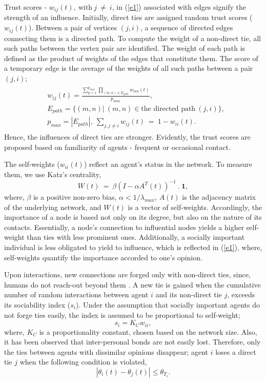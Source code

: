 \documentclass[letterpaper,english,11pt]{article}
\begin{document}
Trust scores - $w_{ij}(t),~\text{with}~j~\neq~i$, in (\ref{e1}) associated with edges signify the strength of an influence. Initially, direct ties are assigned random trust scores ($w_{ij}(t)$). Between a pair of vertices $(j,i)$, a sequence of directed edges connecting them is a directed path. To compute the weight of a non-direct tie, all such paths between the vertex pair are identified. The weight of each path is defined as the product of weights of the edges that constitute them. The score of a temporary edge is the average of the weights of all such paths between a pair $(j,i)$;
\begin{align}
\begin{split}
&w_{ij}(t)=\frac{\sum\limits_{p=1}^{p_{max}}\prod\limits_{(m,n)\in E_{path}}w_{mn}(t)}{p_{max}},\\
&E_{path}=\{(m,n)|\ (m,n)\in \text{the directed path}~ (j,i) \},\\
&p_{max}=|E_{path}|,~\sum_{j,j\neq i}w_{ij}(t)~=~ 1-w_{ii}(t).
\end{split}
\end{align}
Hence, the influences of direct ties are stronger. Evidently, the trust scores are proposed based on familiarity of agents - frequent or occasional contact.

The self-weights ($w_{ii}(t)$) reflect an agent's status in the network. To measure them, we use Katz's centrality, 
\begin{equation}
W(t)~=~\beta(I-\alpha A^{T}(t))^{-1}~.~\mathbf{1},
\end{equation} 
where, $\beta$ is a positive non-zero bias, $\alpha <1/\lambda_{max}$, $A(t)$ is the adjacency matrix of the underlying network, and $W(t)$ is a vector of self-weights. Accordingly, the importance of a node is based not only on its degree, but also on the nature of its contacts. Essentially, a node's connection to influential nodes yields a higher self-weight than ties with less prominent ones. Additionally, a socially important individual is less obligated to yield to influence, which is reflected in (\ref{e1}), where, self-weights quantify the importance accorded to one's opinion. 

Upon interactions, new connections are forged only with non-direct ties, since, humans do not reach-out beyond them \cite{christakis2009connected}. A new tie is gained when the cumulative number of random interactions between agent $i$ and its non-direct tie $j$, exceeds its sociability index ($s_{i}$). Under the assumption that socially important agents do not forge ties easily, the index is assumed to be proportional to self-weight;
\begin{equation}
s_{i} = K_{C}w_{ii},
\end{equation}
where, $K_{C}$ is a proportionality constant, chosen based on the network size. Also, it has been observed that inter-personal bonds are not easily lost. Therefore, only the ties between agents with dissimilar opinions disappear; agent $i$ loses a direct tie $j$ when the following condition is violated, 
\begin{equation}
|\theta_{i}(t)-\theta_{j}(t)|\leq\theta_{T_{i}}.
\end{equation}
\end{document}
